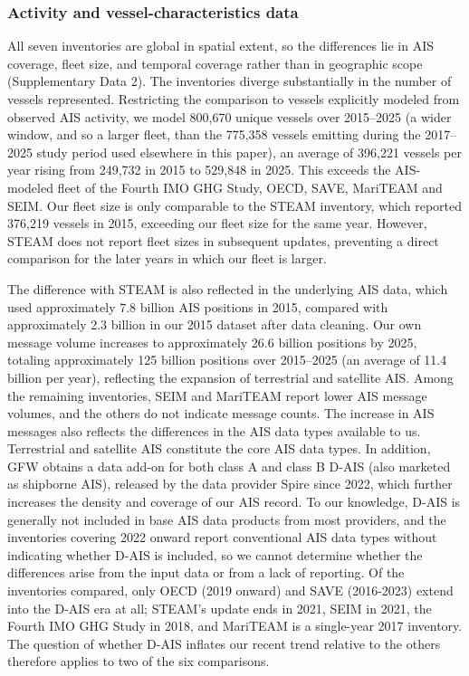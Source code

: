 \subsubsection*{Activity and vessel-characteristics data}

All seven inventories are global in spatial extent, so the differences lie in AIS coverage, fleet size, and temporal coverage rather than in geographic scope (Supplementary Data 2). The inventories diverge substantially in the number of vessels represented. Restricting the comparison to vessels explicitly modeled from observed AIS activity, we model 800,670 unique vessels over 2015--2025 (a wider window, and so a larger fleet, than the 775,358 vessels emitting during the 2017--2025 study period used elsewhere in this paper), an average of 396,221 vessels per year rising from 249,732 in 2015 to 529,848 in 2025. This exceeds the AIS-modeled fleet of the Fourth IMO GHG Study, OECD, SAVE, MariTEAM and SEIM. Our fleet size is only comparable to the STEAM inventory, which reported 376,219 vessels in 2015, exceeding our fleet size for the same year. However, STEAM does not report fleet sizes in subsequent updates, preventing a direct comparison for the later years in which our fleet is larger.

The difference with STEAM is also reflected in the underlying AIS data, which used approximately 7.8 billion AIS positions in 2015, compared with approximately 2.3 billion in our 2015 dataset after data cleaning. Our own message volume increases to approximately 26.6 billion positions by 2025, totaling approximately 125 billion positions over 2015--2025 (an average of 11.4 billion per year), reflecting the expansion of terrestrial and satellite AIS. Among the remaining inventories, SEIM and MariTEAM report lower AIS message volumes, and the others do not indicate message counts. The increase in AIS messages also reflects the differences in the AIS data types available to us. Terrestrial and satellite AIS constitute the core AIS data types. In addition, GFW obtains a data add-on for both class A and class B D-AIS (also marketed as shipborne AIS), released by the data provider Spire since 2022, which further increases the density and coverage of our AIS record. To our knowledge, D-AIS is generally not included in base AIS data products from most providers, and the inventories covering 2022 onward report conventional AIS data types without indicating whether D-AIS is included, so we cannot determine whether the differences arise from the input data or from a lack of reporting. Of the inventories compared, only OECD (2019 onward) and SAVE (2016-2023) extend into the D-AIS era at all; STEAM's update ends in 2021, SEIM in 2021, the Fourth IMO GHG Study in 2018, and MariTEAM is a single-year 2017 inventory. The question of whether D-AIS inflates our recent trend relative to the others therefore applies to two of the six comparisons. 

